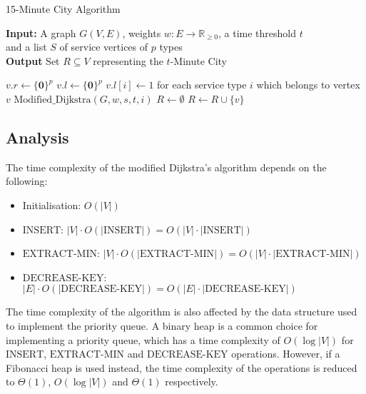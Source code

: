 \begin{algorithm}[H]
    \caption{15-Minute City Algorithm}\label{alg:15mc}
    \textbf{Input:} A graph $G(V,E)$, weights $w:E\rightarrow\mathbb{R}_{\geq 0}$, a time threshold $t$ \\  and a list $S$ of service vertices of $p$ types\\
    \textbf{Output} Set $R\subseteq V$ representing the $t$-Minute City
    \begin{algorithmic}
            \State $v.r \gets \{\mathbf{0}\}^{p}$
            \State $v.l \gets \{\mathbf{0}\}^{p}$
        \EndFor
            \State $v.l[i] \gets 1$ for each service type $i$ which belongs to vertex $v$
        \EndFor
                \State $\text{Modified\_Dijkstra}(G,w,s,t,i)$
            \EndFor
        \EndFor
        \State $R\gets\emptyset$
                \State $R \gets R\cup \{v\}$
            \EndIf
        \EndFor
    \end{algorithmic}
\end{algorithm}

\subsection{Analysis}

The time complexity of the modified Dijkstra's algorithm depends on the following:

\begin{itemize}
    \item Initialisation: $O(|V|)$
    \item $\text{INSERT}$: $|V|\cdot O(|\text{INSERT}|)=O(|V|\cdot|\text{INSERT}|)$
    \item $\text{EXTRACT-MIN}$: $|V|\cdot O(|\text{EXTRACT-MIN}|)=O(|V|\cdot|\text{EXTRACT-MIN}|)$
    \item $\text{DECREASE-KEY}$: $|E|\cdot O(|\text{DECREASE-KEY}|)=O(|E|\cdot|\text{DECREASE-KEY}|)$
\end{itemize}

The time complexity of the algorithm is also affected by the data structure used to implement the priority queue. A binary heap is a common choice for implementing a priority queue, which has a time complexity of $O(\log |V|)$ for $\text{INSERT}$, $\text{EXTRACT-MIN}$ and $\text{DECREASE-KEY}$ operations. However, if a Fibonacci heap is used instead, the time complexity of the operations is reduced to $\Theta(1)$, $O(\log |V|)$ and $\Theta(1)$ respectively.

